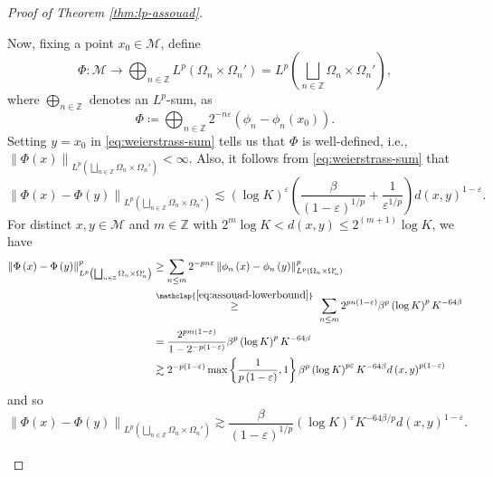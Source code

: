 \documentclass[11pt,reqno]{amsart}
\newcommand{\1}{\mathbf 1}
\begin{document}
\begin{proof}[Proof of Theorem \ref{thm:lp-assouad}]
\begin{enumerate}
Now, fixing a point $x_0\in \mathcal{M}$, define
\[
\Phi:\mathcal{M}\to \bigoplus_{n\in \mathbb{Z}} L^p\left(\Omega_n\times \Omega_n'\right)=L^p\left(\bigsqcup_{n\in \mathbb{Z}}\Omega_n\times \Omega_n'\right),
\]
where $\bigoplus_{n\in \mathbb{Z}}$ denotes an $L^p$-sum, as
\[
\Phi\coloneqq\bigoplus_{n\in \mathbb{Z}}2^{-n\varepsilon}\left(\phi_n-\phi_n\left(x_0\right)\right).
\]
Setting $y=x_0$ in \eqref{eq:weierstrass-sum} tells us that $\Phi$ is well-defined, i.e., $\left\|\Phi\left(x\right)\right\|_{L^p\left(\bigsqcup_{n\in \mathbb{Z}}\Omega_n\times \Omega_n'\right)}<\infty$. Also, it follows from \eqref{eq:weierstrass-sum} that
\[
\left\|\Phi\left(x\right)-\Phi\left(y\right)\right\|_{L^p\left(\bigsqcup_{n\in \mathbb{Z}}\Omega_n\times \Omega_n'\right)}\lesssim  \left(\log K\right)^{\varepsilon} \left(\frac{\beta}{\left(1-\varepsilon\right)^{1/p}}+\frac{1}{\varepsilon^{1/p}}\right)d\left(x,y\right)^{1-\varepsilon}.
\]
For distinct $x,y\in \mathcal{M}$ and $ m\in \mathbb{Z}$ with $2^{m}\log K<d\left(x,y\right)\le 2^{\left(m+1\right)}\log K$, we have
\begin{align*}
    \left\|\Phi\left(x\right)-\Phi\left(y\right)\right\|^p_{L^p\left(\bigsqcup_{n\in \mathbb{Z}}\Omega_n\times \Omega_n'\right)}&\ge \sum_{n\le m}2^{-pn\varepsilon}\left\|\phi_n\left(x\right)-\phi_n\left(y\right)\right\|^p_{L^p\left(\Omega_n\times\Omega_n'\right)}\\
    &\stackrel{\mathclap{\eqref{eq:assouad-lowerbound}}}{\ge}~\sum_{n\le m}2^{pn\left(1-\varepsilon\right)}\beta^p\left(\log K\right)^p K^{-64\beta}\\
    &=\frac{2^{pm\left(1-\varepsilon\right)}}{1-2^{-p\left(1-\varepsilon\right)}}\beta^p\left(\log K\right)^p K^{-64\beta}\\
    &\gtrsim 2^{-p\left(1-\varepsilon\right)}\max\left\{\frac{1}{p\left(1-\varepsilon\right)},1\right\}\beta^p\left(\log K\right)^{p\varepsilon}K^{-64\beta}d\left(x,y\right)^{p\left(1-\varepsilon\right)}
\end{align*}
and so
\[
\left\|\Phi\left(x\right)-\Phi\left(y\right)\right\|_{L^p\left(\bigsqcup_{n\in \mathbb{Z}}\Omega_n\times \Omega_n'\right)}\gtrsim \frac{\beta}{\left(1-\varepsilon\right)^{1/p}} \left(\log K\right)^{\varepsilon}K^{-64\beta/p}d\left(x,y\right)^{1-\varepsilon}.
\]


\end{enumerate}
\end{proof}
\end{document}
